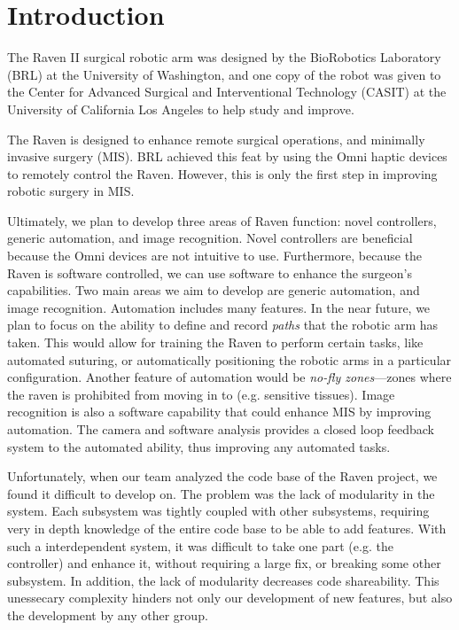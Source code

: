 \documentclass[letterpaper,twocolumn,10pt]{article}
\begin{document}
\section{Introduction}
The Raven II surgical robotic arm was designed by the BioRobotics
Laboratory (BRL) at the University of Washington, and one copy of the
robot was given to the Center for Advanced Surgical and Interventional
Technology (CASIT) at the University of California Los Angeles to help
study and improve.

The Raven is designed to enhance remote surgical operations, and 
minimally invasive surgery (MIS). BRL achieved this feat by using the 
Omni haptic devices to remotely control the Raven. However, this is 
only the first step in improving robotic surgery in MIS.

Ultimately, we plan to develop three areas of Raven function: novel
controllers, generic automation, and image recognition. Novel
controllers are beneficial because the Omni devices are not intuitive
to use.  Furthermore, because the Raven is software controlled, we can
use software to enhance the surgeon's capabilities. Two main areas we
aim to develop are generic automation, and image recognition.
Automation includes many features. In the near future, we plan to
focus on the ability to define and record \emph{paths} that the
robotic arm has taken. This would allow for training the Raven to
perform certain tasks, like automated suturing, or automatically
positioning the robotic arms in a particular configuration. Another
feature of automation would be \emph{no-fly zones}---zones where the
raven is prohibited from moving in to (e.g. sensitive tissues).  Image
recognition is also a software capability that could enhance MIS by
improving automation. The camera and software analysis provides a
closed loop feedback system to the automated ability, thus improving
any automated tasks.

Unfortunately, when our team analyzed the code base of the Raven 
project, we found it difficult to develop on. The problem was the lack 
of modularity in the system. Each subsystem was tightly coupled with 
other subsystems, requiring very in depth knowledge of the entire 
code base to be able to add features. With such a interdependent 
system, it was difficult to take one part (e.g. the controller) and 
enhance it, without requiring a large fix, or breaking some other 
subsystem. In addition, the lack of modularity decreases code 
shareability. This unessecary complexity hinders not only our 
development of new features, but also the development by any other 
group.
\end{document}
